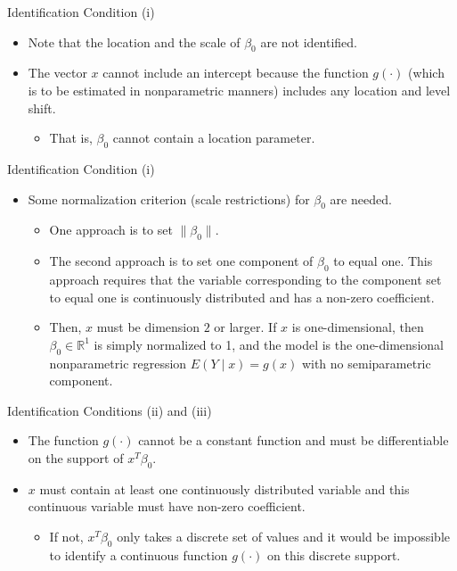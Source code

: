 \documentclass[xcolor=svgnames,dvipdfmx,cjk]{beamer}
\theoremstyle{example}
\begin{document}
\begin{frame}{Identification Condition (i)}
\begin{itemize}
  \item Note that \alert{the location and the scale of $\beta_0$ are not identified}.
  \item The vector $x$ cannot include an intercept 
        because the function $g(\cdot)$ (which is to be estimated in nonparametric manners) includes any location and level shift.
        \begin{itemize}
          \item That is, $\beta_0$ cannot contain a location parameter.
        \end{itemize}
\end{itemize}
\end{frame}

\begin{frame}{Identification Condition (i)}
  \begin{itemize}
    \item Some normalization criterion (scale restrictions) for $\beta_0$ are needed.
          \begin{itemize}
            \item One approach is to set $\| \beta_0 \|$.
            \item The second approach is to set one component of $\beta_0$ to equal one. 
                  This approach requires that 
                  the variable corresponding to the component set to equal one 
                  is continuously distributed 
                  and has a non-zero coefficient.
            \item Then, $x$ must be dimension $2$ or larger. 
                  If $x$ is one-dimensional, then $\beta_0 \in \mathbb{R}^1$ is simply normalized to 1, 
                  and the model is the one-dimensional nonparametric regression $E(Y \mid x) = g(x)$ with no semiparametric component.
          \end{itemize}
  \end{itemize}
  
\end{frame}

\begin{frame}{Identification Conditions (ii) and (iii)}
\begin{itemize}
  \item The function $g(\cdot)$ cannot be a constant function and must be differentiable on the support of $x^{T}\beta_0$.
  \item $x$ must contain at least one continuously distributed variable
        and this continuous variable must have non-zero coefficient.
        \begin{itemize}
          \item  If not, $x^{T} \beta_0$ only takes a discrete set of values and it would be impossible to identify a continuous function $g(\cdot)$ on this discrete support.
        \end{itemize}
\end{itemize}
\end{frame}
\end{document}
